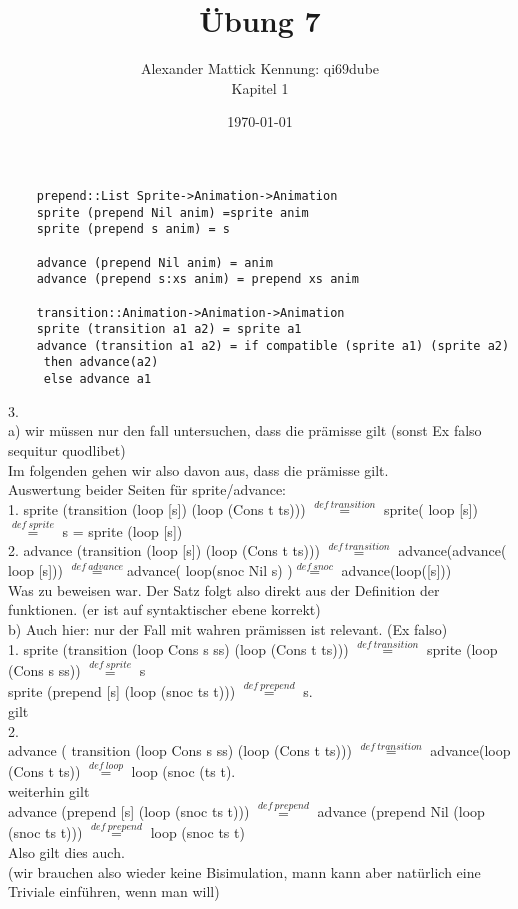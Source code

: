 \documentclass{article}
\author{
Alexander Mattick Kennung: qi69dube\\
Kapitel 1
}
\date{\today}
\title{Übung 7}
\begin{document}
	\maketitle
	\begin{verbatim}
	prepend::List Sprite->Animation->Animation
	sprite (prepend Nil anim) =sprite anim
	sprite (prepend s anim) = s

	advance (prepend Nil anim) = anim
	advance (prepend s:xs anim) = prepend xs anim

	transition::Animation->Animation->Animation
	sprite (transition a1 a2) = sprite a1
	advance (transition a1 a2) = if compatible (sprite a1) (sprite a2)
	 then advance(a2)
	 else advance a1
	\end{verbatim}
	3.\\
	a) wir müssen nur den fall untersuchen, dass die prämisse gilt (sonst Ex falso sequitur quodlibet)\\
	Im folgenden gehen wir also davon aus, dass die prämisse gilt.\\
	Auswertung beider Seiten für sprite/advance:\\
	1. sprite (transition (loop [s]) (loop (Cons t ts))) $\stackrel{def\ transition}{=}$ sprite( loop [s]) $\stackrel{def\ sprite}{=}$ s = sprite (loop [s])\\
	2. advance (transition (loop [s]) (loop (Cons t ts))) $\stackrel{def\ transition}{=}$ advance(advance( loop [s])) $\stackrel{def\ advance}{=}$advance( loop(snoc Nil s) )$\stackrel{def\ snoc}{=}$ advance(loop([s]))\\
	Was zu beweisen war. Der Satz folgt also direkt aus der Definition der funktionen. (er ist auf syntaktischer ebene korrekt)\\
	b) Auch hier: nur der Fall mit wahren prämissen ist relevant. (Ex falso)\\
	1. sprite (transition (loop Cons s ss) (loop (Cons t ts))) $\stackrel{def\ transition}{=}$ sprite (loop (Cons s ss)) $\stackrel{def\ sprite}{=}$ s\\
	sprite (prepend [s] (loop (snoc ts t))) $\stackrel{def\ prepend}{=}$ s.\\
	gilt\\
	2.\\
	advance ( transition (loop Cons s ss) (loop (Cons t ts))) $\stackrel{def\ transition}{=}$ advance(loop (Cons t ts)) $\stackrel{def\ loop}{=}$ loop (snoc (ts t).\\
	weiterhin gilt\\
	advance (prepend [s] (loop (snoc ts t)))  $\stackrel{def\ prepend}{=}$ advance (prepend Nil (loop (snoc ts t))) $\stackrel{def\ prepend}{=}$ loop (snoc ts t)\\
	Also gilt dies auch.\\
	(wir brauchen also wieder keine Bisimulation, mann kann aber natürlich eine Triviale einführen, wenn man will)\\
\end{document}
